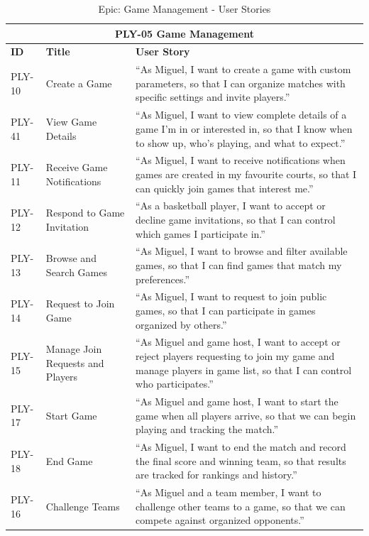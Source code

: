 \begin{table}[h]
	\centering
	\caption{Epic: Game Management - User Stories}
	\label{tab:epic-game-management}
	\begin{tabular}{p{2cm}p{4cm}p{8cm}}
		\toprule
		\multicolumn{3}{c}{\textbf{PLY-05 Game Management}} \\
		\midrule
		\textbf{ID} & \textbf{Title} & \textbf{User Story} \\
		\midrule
		PLY-10 & Create a Game & ``As Miguel, I want to create a game with custom parameters, so that I can organize matches with specific settings and invite players.'' \\
		\midrule
		PLY-41 & View Game Details & ``As Miguel, I want to view complete details of a game I'm in or interested in, so that I know when to show up, who's playing, and what to expect.'' \\
		\midrule
		PLY-11 & Receive Game Notifications & ``As Miguel, I want to receive notifications when games are created in my favourite courts, so that I can quickly join games that interest me.'' \\
		\midrule
		PLY-12 & Respond to Game Invitation & ``As a basketball player, I want to accept or decline game invitations, so that I can control which games I participate in.'' \\
		\midrule
		PLY-13 & Browse and Search Games & ``As Miguel, I want to browse and filter available games, so that I can find games that match my preferences.'' \\
		\midrule
		PLY-14 & Request to Join Game & ``As Miguel, I want to request to join public games, so that I can participate in games organized by others.'' \\
		\midrule
		PLY-15 & Manage Join Requests and Players & ``As Miguel and game host, I want to accept or reject players requesting to join my game and manage players in game list, so that I can control who participates.'' \\
		\midrule
		PLY-17 & Start Game & ``As Miguel and game host, I want to start the game when all players arrive, so that we can begin playing and tracking the match.'' \\
		\midrule
		PLY-18 & End Game & ``As Miguel, I want to end the match and record the final score and winning team, so that results are tracked for rankings and history.'' \\
		\midrule
		PLY-16 & Challenge Teams & ``As Miguel and a team member, I want to challenge other teams to a game, so that we can compete against organized opponents.'' \\

\end{tabular}
\end{table}
